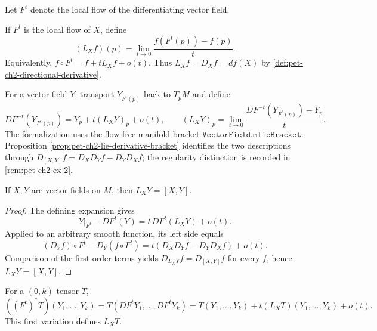 Let $F^t$ denote the local flow of the differentiating vector field.

\begin{definition}
  \label{def:pet-ch2-lie-derivative-function}
  \leanok
  If $F^t$ is the local flow of
  $X$, define
  \[
    (L_Xf)(p)
      =\lim_{t\to0}\frac{f(F^t(p))-f(p)}t.
  \]
  Equivalently, $f\circ F^t=f+tL_Xf+o(t)$. Thus
  $L_Xf=D_Xf=df(X)$ by
  \cref{def:pet-ch2-directional-derivative}.
\end{definition}

\begin{definition}
  \label{def:pet-ch2-lie-derivative-vector-field}
  \leanok
  For a vector field $Y$,
  transport $Y_{F^t(p)}$ back to $T_pM$ and define
  \[
    DF^{-t}(Y_{F^t(p)})
      =Y_p+t(L_XY)_p+o(t),
    \qquad
    (L_XY)_p
      =\lim_{t\to0}
         \frac{DF^{-t}(Y_{F^t(p)})-Y_p}{t}.
  \]
  The formalization uses the flow-free manifold bracket
  $\texttt{VectorField.mlieBracket}$. Proposition
  \cref{prop:pet-ch2-lie-derivative-bracket} identifies the two descriptions
  through
  $D_{[X,Y]}f=D_XD_Yf-D_YD_Xf$; the regularity distinction is recorded in
  \cref{rem:pet-ch2-ex-2}.
\end{definition}

\begin{proposition}
  \label{prop:pet-ch2-lie-derivative-bracket}
  \leanok
  If $X,Y$ are vector fields on $M$, then $L_XY=[X,Y]$.
\end{proposition}
\begin{proof}
  \leanok
  \sketch
  The defining expansion gives
  \[
    Y|_{F^t}-DF^t(Y)=t\,DF^t(L_XY)+o(t).
  \]
  Applied to an arbitrary smooth function, its left side equals
  \[
    (D_Yf)\circ F^t-D_Y(f\circ F^t)
      =t(D_XD_Yf-D_YD_Xf)+o(t).
  \]
  Comparison of the first-order terms yields
  $D_{L_XY}f=D_{[X,Y]}f$ for every $f$, hence $L_XY=[X,Y]$.
\end{proof}

\begin{definition}
  \label{def:pet-ch2-lie-derivative-tensor}
  \leanok
  For a $(0,k)$-tensor $T$,
  \[
    ((F^t)^*T)(Y_1,\dots,Y_k)
      =T(DF^tY_1,\dots,DF^tY_k)
      =T(Y_1,\dots,Y_k)+t(L_XT)(Y_1,\dots,Y_k)+o(t).
  \]
  This first variation defines $L_XT$.
\end{definition}

